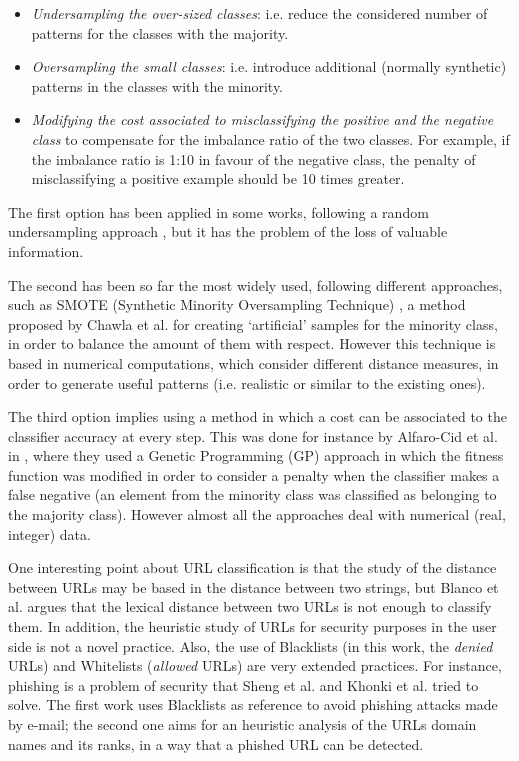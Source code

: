 \documentclass{llncs}
\begin{document}
\begin{itemize}
\item \textit{Undersampling the over-sized classes}: i.e. reduce the considered number of patterns for the classes with the majority.
\item \textit{Oversampling the small classes}: i.e. introduce additional (normally synthetic) patterns in the classes with the minority.
\item \textit{Modifying the cost associated to misclassifying the positive and the negative class} to compensate for the imbalance ratio of the two classes. For example, if the imbalance ratio is 1:10 in favour of the negative class, the penalty of misclassifying a positive example should be 10 times greater.
\end{itemize}

The first option has been applied in some works, following a random undersampling approach \cite{random_undersampling_08}, but it has the problem of the loss of valuable information. 

The second has been so far the most widely used, following different approaches, such as SMOTE (Synthetic Minority Oversampling Technique) \cite{smote_02}, a method proposed by Chawla et al. for creating `artificial' samples for the minority class, in order to balance the amount of them with respect. However this technique is based in numerical computations, which consider different distance measures, in order to generate useful patterns  (i.e. realistic or similar to the existing ones).

The third option implies using a method in which a cost can be associated to the classifier accuracy at every step. This was done for instance by Alfaro-Cid et al. in \cite{cost_adjustment_07}, where they used a Genetic Programming (GP) approach in which the fitness function was modified in order to consider a penalty when the classifier makes a false negative (an element from the minority class was classified as belonging to the majority class).
However almost all the approaches deal with numerical (real, integer) data.

One interesting point about URL classification is that the study of the distance between URLs may be based in the distance between two strings, but Blanco et al. \cite{Blanco2011} argues that the lexical distance between two URLs is not enough to classify them. In addition, the heuristic study of URLs for security purposes in the user side is not a novel practice. Also, the use of Blacklists (in this work, the \textit{denied} URLs) and Whitelists (\textit{allowed} URLs) are very extended practices. For instance, phishing is a problem of security that Sheng et al.  and Khonki et al. \cite{Khonji2011} tried to solve. The first work uses Blacklists as reference to avoid phishing attacks made by e-mail; the second one aims for an heuristic analysis of the URLs domain names and its ranks, in a way that a phished URL can be detected.
\end{document}
